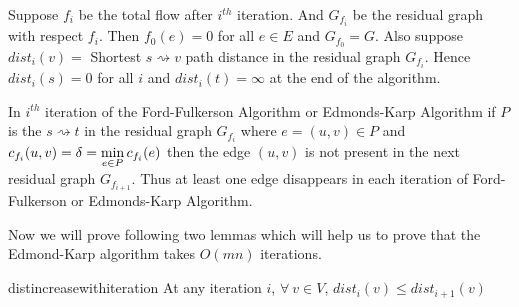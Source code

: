 Suppose $f_i$ be the total flow after $i^{th}$ iteration. And $G_{f_i}$ be the residual graph with respect $f_i$. Then $f_0(e)=0$ for all $e\in E$ and $G_{f_0}=G$. Also suppose $\textit{dist}_i(v)=$ Shortest $s\rightsquigarrow v$ path distance in the residual graph $G_{f_i}$. Hence $\textit{dist}_i(s)=0$ for all $i$ and $\textit{dist}_i(t)=\infty$ at the end of the algorithm. 
\begin{note}
	In $i^{th}$ iteration of the Ford-Fulkerson Algorithm or Edmonds-Karp Algorithm if $P$ is the $s\rightsquigarrow t$ in the residual graph $G_{f_i}$ where $e=(u,v)\in P$  and $c_{f_i}(u,v)=\delta=\min\limits_{e\in P}c_{f_i}(e)$ then the edge $(u,v)$ is not present in the next residual graph $G_{f_{i+1}}$. Thus at least one edge disappears in each iteration of Ford-Fulkerson or Edmonds-Karp Algorithm.
\end{note}
Now we will prove following two lemmas which will help us to prove that the Edmond-Karp algorithm takes $O(mn)$ iterations. 
\begin{lemma}{}{distincreasewithiteration}
At any iteration $i$, 	$\forall\ v\in V$, $\textit{dist}_i(v)\leq\textit{dist}_{i+1}(v)$
\end{lemma}
